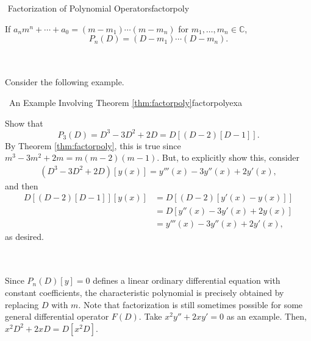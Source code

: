         \begin{theorem}{\Stop\,\,Factorization of Polynomial Operators}{factorpoly}

            If \(a_nm^n+\cdots+a_0=(m-m_1)\cdots(m-m_n)\) for \(m_1,\ldots,m_n\in\mathbb{C}\), 
            \begin{equation*}
                P_n(D)=(D-m_1)\cdots(D-m_n).
            \end{equation*}
            
        \end{theorem}
        \pagebreak
        \vphantom
        \\
        \\
        Consider the following example.
        \begin{example}{\Difficulty\,\Difficulty\,\,An Example Involving Theorem \ref{thm:factorpoly}}{factorpolyexa}

            Show that
            \begin{equation*}
                P_3(D)=D^3-3D^2+2D=D[(D-2)[D-1]].
            \end{equation*}
            By Theorem \ref{thm:factorpoly}, this is true since \(m^3-3m^2+2m=m(m-2)(m-1)\). But, to explicitly show this, consider
            \begin{align*}
                (D^3-3D^2+2D)[y(x)]=y'''(x)-3y''(x)+2y'(x),
            \end{align*}
            and then
            \begin{align*}
                D[(D-2)[D-1]][y(x)]&=D[(D-2)[y'(x)-y(x)]] \\
                &=D[y''(x)-3y'(x)+2y(x)] \\
                &=y'''(x)-3y''(x)+2y'(x),
            \end{align*}
            as desired.
            
        \end{example}
        \vphantom
        \\
        \\
        Since \(P_n(D)[y]=0\) defines a linear ordinary differential equation with constant coefficients, the characteristic polynomial is precisely obtained by replacing \(D\) with \(m\). Note that factorization is still sometimes possible for some general differential operator \(F(D)\). Take \(x^2y''+2xy'=0\) as an example. Then, \(x^2D^2+2xD=D[x^2D]\).